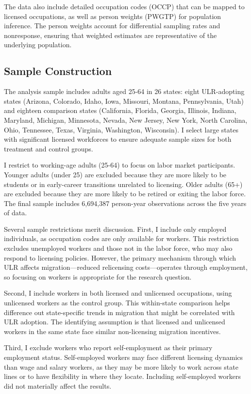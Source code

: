 \documentclass[12pt]{article}
\begin{document}
The data also include detailed occupation codes (OCCP) that can be mapped to licensed occupations, as well as person weights (PWGTP) for population inference. The person weights account for differential sampling rates and nonresponse, ensuring that weighted estimates are representative of the underlying population.

\subsection{Sample Construction}

The analysis sample includes adults aged 25-64 in 26 states: eight ULR-adopting states (Arizona, Colorado, Idaho, Iowa, Missouri, Montana, Pennsylvania, Utah) and eighteen comparison states (California, Florida, Georgia, Illinois, Indiana, Maryland, Michigan, Minnesota, Nevada, New Jersey, New York, North Carolina, Ohio, Tennessee, Texas, Virginia, Washington, Wisconsin). I select large states with significant licensed workforces to ensure adequate sample sizes for both treatment and control groups.

I restrict to working-age adults (25-64) to focus on labor market participants. Younger adults (under 25) are excluded because they are more likely to be students or in early-career transitions unrelated to licensing. Older adults (65+) are excluded because they are more likely to be retired or exiting the labor force. The final sample includes 6,694,387 person-year observations across the five years of data.

Several sample restrictions merit discussion. First, I include only employed individuals, as occupation codes are only available for workers. This restriction excludes unemployed workers and those not in the labor force, who may also respond to licensing policies. However, the primary mechanism through which ULR affects migration---reduced relicensing costs---operates through employment, so focusing on workers is appropriate for the research question.

Second, I include workers in both licensed and unlicensed occupations, using unlicensed workers as the control group. This within-state comparison helps difference out state-specific trends in migration that might be correlated with ULR adoption. The identifying assumption is that licensed and unlicensed workers in the same state face similar non-licensing migration incentives.

Third, I exclude workers who report self-employment as their primary employment status. Self-employed workers may face different licensing dynamics than wage and salary workers, as they may be more likely to work across state lines or to have flexibility in where they locate. Including self-employed workers did not materially affect the results.
\end{document}
